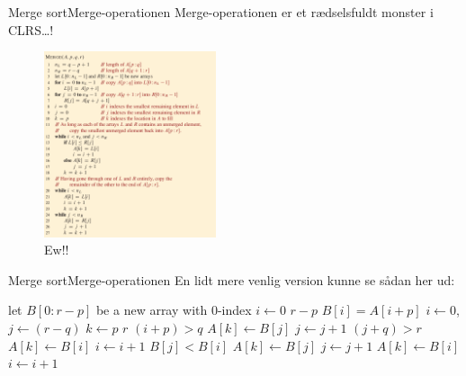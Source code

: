 \documentclass{beamer}
\begin{document}
\begin{frame}{Merge sort}{Merge-operationen}
    Merge-operationen er et rædselsfuldt monster i CLRS\ldots!

    \begin{figure}[h]
        \centering
        \includegraphics[width=0.45\textwidth]{merge-clrs}
        \caption{Ew!!}
        \label{fig:merge-clrs}
    \end{figure}
\end{frame}

\begin{frame}{Merge sort}{Merge-operationen}
    En lidt mere venlig version kunne se sådan her ud:

    \centering
    \begin{minipage}{.8\textwidth}
        \scriptsize
        \begin{tcolorbox}
            
            \vspace{-\abovedisplayskip}
            \begin{codebox}
                \li let $B[0:r-p]$ be a new array with 0-index
                \li \For $i \gets 0$ \To $r-p$ \Do
                    \li $B[i] = A[i+p]$
                \End
                \li $i \gets 0$, $j \gets (r-q)$
                \li \For $k \gets p$ \To $r$ \Do
                    \li \If $(i + p) > q$ \Then
                        \li $A[k] \gets B[j]$
                        \li $j \gets j + 1$
                    \li \ElseIf $(j + q) > r$ \Then
                        \li $A[k] \gets B[i]$
                        \li $i \gets i + 1$
                    \li \ElseIf $B[j] < B[i]$ \Then
                        \li $A[k] \gets B[j]$
                        \li $j \gets j + 1$
                    \li \Else
                        \li $A[k] \gets B[i]$
                        \li $i \gets i + 1$
                    \End
                \End
            \end{codebox}
        \end{tcolorbox}
    \end{minipage}
\end{frame}
\end{document}
